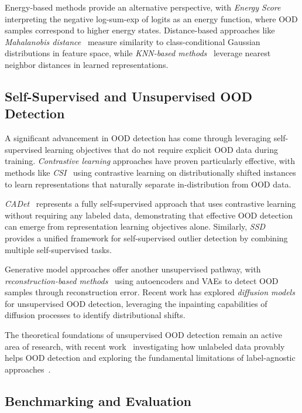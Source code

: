\documentclass[11pt, oneside]{book}
\theoremstyle{plain}
\theoremstyle{definition}
\theoremstyle{remark}
\begin{document}
Energy-based methods provide an alternative perspective, with \emph{Energy Score}~\citep{liu2020energy} interpreting the negative log-sum-exp of logits as an energy function, where OOD samples correspond to higher energy states. Distance-based approaches like \emph{Mahalanobis distance}~\citep{lee2018simple} measure similarity to class-conditional Gaussian distributions in feature space, while \emph{KNN-based methods}~\citep{sun2022out} leverage nearest neighbor distances in learned representations.

\subsection{Self-Supervised and Unsupervised OOD Detection}

A significant advancement in OOD detection has come through leveraging self-supervised learning objectives that do not require explicit OOD data during training. \emph{Contrastive learning} approaches have proven particularly effective, with methods like \emph{CSI}~\citep{tack2020csi} using contrastive learning on distributionally shifted instances to learn representations that naturally separate in-distribution from OOD data.

\emph{CADet}~\citep{guille2024cadet} represents a fully self-supervised approach that uses contrastive learning without requiring any labeled data, demonstrating that effective OOD detection can emerge from representation learning objectives alone. Similarly, \emph{SSD}~\citep{sehwag2021ssd} provides a unified framework for self-supervised outlier detection by combining multiple self-supervised tasks.

Generative model approaches offer another unsupervised pathway, with \emph{reconstruction-based methods}~\citep{zhou2022rethinking} using autoencoders and VAEs to detect OOD samples through reconstruction error. Recent work has explored \emph{diffusion models}~\citep{liu2023unsupervised} for unsupervised OOD detection, leveraging the inpainting capabilities of diffusion processes to identify distributional shifts.

The theoretical foundations of unsupervised OOD detection remain an active area of research, with recent work~\citep{du2024does} investigating how unlabeled data provably helps OOD detection and exploring the fundamental limitations of label-agnostic approaches~\citep{yangcan}.

\subsection{Benchmarking and Evaluation}
\end{document}
